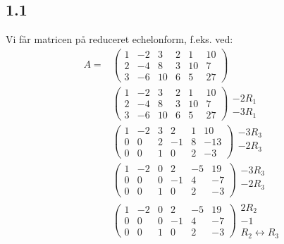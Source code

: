 		\subsection{1.1}

		Vi får matricen på reduceret echelonform, f.eks. ved:
			\begin{align*}
				A=&\left(\begin{array}{cccccc}{1} & {-2} & {3} & {2} & {1} & {10} \\ {2} & {-4} & {8} & {3} & {10} & {7} \\ {3} & {-6} & {10} & {6} & {5} & {27}\end{array}\right) \\
				&\left(\begin{array}{cccccc}{1} & {-2} & {3} & {2} & {1} & {10} \\ {2} & {-4} & {8} & {3} & {10} & {7} \\ {3} & {-6} & {10} & {6} & {5} & {27}\end{array}\right) \begin{array}{c} \, \\ -2R_1 \\ -3R_1 \end{array}\\
				&\left(\begin{array}{cccccc}{1} & {-2} & {3} & {2} & {1} & {10} \\ {0} & {0} & {2} & {-1} & {8} & {-13} \\ {0} & {0} & {1} & {0} & {2} & {-3}\end{array}\right) \begin{array}{c} -3R_3 \\ -2R_3 \\ \, \end{array}\\
				&\left(\begin{array}{cccccc}{1} & {-2} & {0} & {2} & {-5} & {19} \\ {0} & {0} & {0} & {-1} & {4} & {-7} \\ {0} & {0} & {1} & {0} & {2} & {-3}\end{array}\right) \begin{array}{c} -3R_3 \\ -2R_3 \\ \, \end{array}\\
				&\left(\begin{array}{cccccc}{1} & {-2} & {0} & {2} & {-5} & {19} \\ {0} & {0} & {0} & {-1} & {4} & {-7} \\ {0} & {0} & {1} & {0} & {2} & {-3}\end{array}\right) \begin{array}{c} 2R_2 \\ -1 \\ R_2\leftrightarrow R_3 \end{array}\\

\end{align*}

